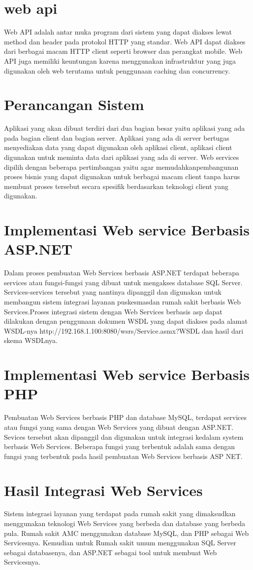 \section{web api}
Web API adalah antar muka program dari sistem yang dapat diakses lewat method dan
header pada protokol HTTP yang standar. Web API dapat diakses dari berbagai macam HTTP
client seperti browser dan perangkat mobile. Web API juga memiliki keuntungan karena
menggunakan infrastruktur yang juga digunakan oleh web terutama untuk penggunaan caching
dan concurrency.


\section{Perancangan Sistem}
Aplikasi yang akan dibuat terdiri dari dua bagian besar yaitu aplikasi yang ada pada bagian client dan bagian server. Aplikasi yang ada di server bertugas menyediakan data yang dapat digunakan oleh aplikasi client, aplikasi client digunakan untuk meminta data dari aplikasi yang ada di server. Web services dipilih dengan beberapa pertimbangan yaitu agar memudahkanpembangunan proses bisnis yang dapat digunakan untuk berbagai macam client tanpa harus membuat proses tersebut secara spesifik berdasarkan teknologi client yang digunakan.


\section{Implementasi Web service Berbasis ASP.NET}
Dalam proses pembuatan Web Services berbasis ASP.NET terdapat beberapa services atau fungsi-fungsi yang dibuat untuk mengakses database SQL Server. Services-services tersebut yang nantinya dipanggil dan digunakan untuk membangun sistem integrasi layanan puskesmasdan rumah sakit berbasis Web Services.Proses integrasi sistem dengan Web Services berbasis asp dapat dilakukan dengan penggunaan dokumen WSDL yang dapat diakses pada alamat WSDL-nya http://192.168.1.100:8080/wsrs/Service.asmx?WSDL dan hasil dari skema WSDLnya.


\section{Implementasi Web service Berbasis PHP}
Pembuatan Web Services berbasis PHP dan database MySQL, terdapat  services atau fungsi yang sama dengan Web Services yang dibuat dengan ASP.NET. Sevices tersebut akan dipanggil dan digunakan untuk integrasi kedalam system berbasis Web Services. Beberapa fungsi yang terbentuk adalah sama dengan fungsi yang terbentuk pada hasil pembuatan Web Services berbasis ASP NET.

\section{Hasil Integrasi Web Services}
Sistem integrasi  layanan yang terdapat pada rumah sakit yang dimaksudkan menggunakan teknologi Web Services yang berbeda dan database yang berbeda pula. Rumah sakit AMC menggunakan database MySQL, dan PHP sebagai Web Servicesnya. Kemudian untuk Rumah sakit umum menggunakan SQL Server sebagai databasenya, dan ASP.NET sebagai tool untuk membuat Web Servicesnya.
